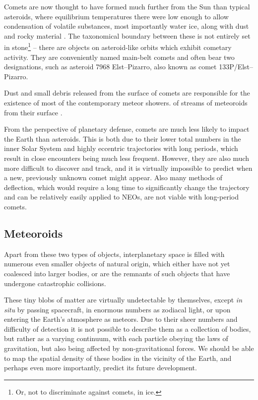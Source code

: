         Comets are now thought to have formed much further from the Sun than typical asteroids,
        where equilibrium temperatures there were low enough to allow condensation of volatile substances, most importantly water ice,
        along with dust and rocky material \citep{???}.
        The taxonomical boundary between these is not entirely set in stone\footnote{Or, not to discriminate against comets, in ice.} -- there
        are objects on asteroid-like orbits which exhibit cometary activity.
        They are conveniently named main-belt comets and often bear two designations, such as asteroid 7968 Elst--Pizarro,
        also known as comet 133P/Elst--Pizarro.

        Dust and small debris released from the surface of comets are responsible
        for the existence of most of the contemporary meteor showers.
        of streams of meteoroids from their surface \citep{???}.

        From the perspective of planetary defense, comets are much less likely to impact the Earth
        than asteroids. This is both due to their lower total numbers in the inner Solar System
        and highly eccentric trajectories with long periods, which result in close encounters being much less frequent.
        However, they are also much more difficult to discover and track, and it is virtually impossible
        to predict when a new, previously unknown comet might appear.
        Also many methods of deflection, which would require a long time to significantly change the trajectory and
        can be relatively easily applied to NEOs, are not viable with long-period comets.

    \subsection{Meteoroids} \label{iam}
        Apart from these two types of objects, interplanetary space is filled with numerous even smaller objects
        of natural origin, which either have not yet coalesced into larger bodies, or are the remnants
        of such objects that have undergone catastrophic collisions.

        These tiny blobs of matter are virtually undetectable by themselves, except \textit{in situ} by passing spacecraft,
        in enormous numbers as zodiacal light, or upon entering the Earth's atmosphere as meteors.
        Due to their sheer numbers and difficulty of detection it is not possible to describe them as a collection of bodies,
        but rather as a varying continuum, with each particle obeying the laws of gravitation, but also being affected by non-gravitational forces.
        We should be able to map the spatial density of these bodies in the vicinity of the Earth,
        and perhaps even more importantly, predict its future development.

